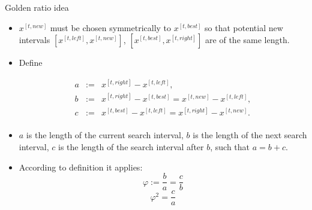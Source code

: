\begin{vbframe}{Golden ratio idea}
\begin{itemize}








\item $x^{[t, new]}$ must be chosen symmetrically to $x^{[t, best]}$ so that potential new intervals $[x^{[t, left]}, x^{[t, new]}]$, $[x^{[t, best]}, x^{[t, right]}]$  are of the same length.
\item Define
\vspace*{-0.3cm}
\begin{footnotesize}
\begin{eqnarray*}
a &:=& x^{[t, right]}-x^{[t, left]}, \\
b &:=& x^{[t, right]}-x^{[t, best]} = x^{[t, new]}-x^{[t, left]},\\
c &:=& x^{[t, best]}-x^{[t, left]} = x^{[t, right]}-x^{[t, new]}.\\
\end{eqnarray*}
\end{footnotesize}
\item $a$ is the length of the current search interval, $b$ is the length of the next search interval, $c$ is the length of the search interval after $b$, such that $a = b + c$.
\item According to definition it applies:
$$
\varphi := \frac{b}{a} = \frac{c}{b}
$$
$$
\varphi^2 = \frac{c}{a}
$$


\end{itemize}
\end{vbframe}
